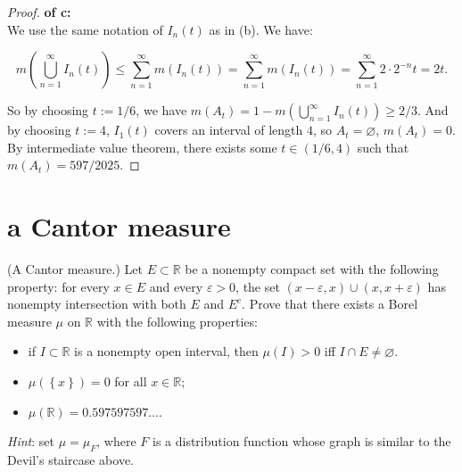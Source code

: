 \begin{proof}

\textbf{of c:\\
}{ }We use the same notation of \(I_{n}(t)\) as in (b). We have:

\[m(\bigcup\limits_{n = 1}^{\infty}I_{n}(t)) \leq \sum\limits_{n = 1}^{\infty}m(I_{n}(t)) = \sum\limits_{n = 1}^{\infty}m(I_{n}(t)) = \sum\limits_{n = 1}^{\infty}2 \cdot 2^{- n}t = 2t.\]

So by choosing \(t := 1/6\), we have \(m(A_{t}) = 1 - m(\bigcup_{n = 1}^{\infty}I_{n}(t)) \geq 2/3\). And by choosing \(t := 4\), \(I_{1}(t)\) covers an interval of length \(4\), so \(A_{t} = \varnothing\), \(m(A_{t}) = 0\). By intermediate value theorem, there exists some \(t \in (1/6,4)\) such that \(m(A_{t}) = 597/2025\).

\end{proof}

\section{a Cantor measure}\label{a-cantor-measure}

(A Cantor measure.) Let \(E \subset \mathbb{R}\) be a nonempty compact set with the following property: for every \(x \in E\) and every \(\varepsilon > 0\), the set \((x - \varepsilon,x) \cup (x,x + \varepsilon)\) has nonempty intersection with both \(E\) and \(E^{c}\). Prove that there exists a Borel measure \(\mu\) on \(\mathbb{R}\) with the following properties:

\begin{itemize}
\item
  if \(I \subset \mathbb{R}\) is a nonempty open interval, then \(\mu(I) > 0\) iff \(I \cap E \neq \varnothing\).
\item
  \(\mu(\left\{ x \right\}) = 0\) for all \(x \in \mathbb{R}\);
\item
  \(\mu(\mathbb{R}) = 0.597597597\ldots\).
\end{itemize}

\emph{Hint}: set \(\mu = \mu_{F}\), where \(F\) is a distribution function whose graph is similar to the Devil's staircase above.

